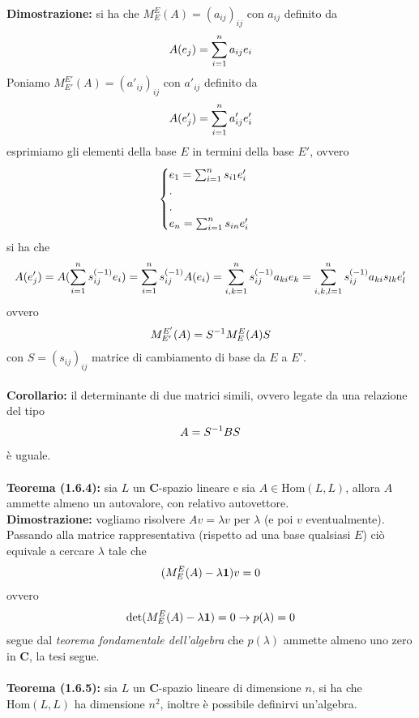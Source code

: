 \documentclass{article}
\begin{document}
\textbf{Dimostrazione:} si ha che $M^E_E(A) = (a_{ij})_{ij}$ con $a_{ij}$ definito da
\begin{gather}
    A(e_j) = \sum_{i = 1}^na_{ij}e_i \notag
\end{gather}
Poniamo $M^{E'}_{E'}(A) = (a'_{ij})_{ij}$ con $a'_{ij}$ definito da
\begin{gather}
    A(e'_j) = \sum_{i = 1}^na'_{ij}e'_i \notag
\end{gather}
esprimiamo gli elementi della base $E$ in termini della base $E'$, ovvero
\begin{gather}
    \begin{cases}
        e_1 = \sum_{i = 1}^n s_{i1}e'_i \\
        . \\
        . \\
        e_n = \sum_{i = 1}^n s_{in}e'_i
    \end{cases} \notag
\end{gather}
si ha che
\begin{gather}
    A(e'_j) = A(\sum_{i = 1}^n s^{(-1)}_{ij}e_i) = \sum_{i = 1}^ns^{(-1)}_{ij}A(e_i) = \sum_{i, k = 1}^n s^{(-1)}_{ij}a_{ki}e_k = \sum_{i, k, l = 1}^n s^{(-1)}_{ij}a_{ki}s_{lk}e'_l \notag
\end{gather}
ovvero
\begin{gather}
    M^{E'}_{E'}(A) = S^{-1}M^E_E(A)S \notag
\end{gather}
con $S = (s_{ij})_{ij}$ matrice di cambiamento di base da $E$ a $E'$. \\ \\
\textbf{Corollario:} il determinante di due matrici simili, ovvero legate da una relazione del tipo
\begin{gather}
    A = S^{-1}BS \notag
\end{gather}
è uguale. \\ \\
\textbf{Teorema (1.6.4):} sia $L$ un $\mathbf{C}$-spazio lineare e sia $A \in \mathrm{Hom}(L, L)$, allora $A$ ammette almeno un autovalore, con relativo autovettore. \\

\textbf{Dimostrazione:} vogliamo risolvere $Av = \lambda v$ per $\lambda$ (e poi $v$ eventualmente). Passando alla matrice rappresentativa (rispetto ad una base qualsiasi $E$) ciò equivale a cercare $\lambda$ tale che
\begin{gather}
    (M^E_E(A) - \lambda\mathbf{1})v = 0 \notag
\end{gather}
ovvero
\begin{gather}
    \det(M^E_E(A) - \lambda\mathbf{1}) = 0 \rightarrow p(\lambda) = 0 \notag
\end{gather}
segue dal \textit{teorema fondamentale dell'algebra} che $p(\lambda)$ ammette almeno uno zero in $\mathbf{C}$, la tesi segue. \\ \\
\textbf{Teorema (1.6.5):} sia $L$ un $\mathbf{C}$-spazio lineare di dimensione $n$, si ha che $\mathrm{Hom}(L, L)$ ha dimensione $n^2$, inoltre è possibile definirvi un'algebra. \\
\end{document}
